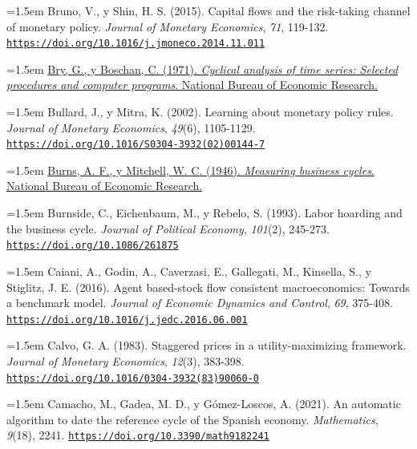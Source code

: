 \documentclass[10pt,a4paper]{article}
\begin{document}
\noindent\hangindent=1.5em Bruno, V., y Shin, H. S. (2015). Capital flows and the risk-taking channel of monetary policy. \textit{Journal of Monetary Economics}, \textit{71}, 119-132. \href{https://doi.org/10.1016/j.jmoneco.2014.11.011}{\nolinkurl{https://doi.org/10.1016/j.jmoneco.2014.11.011}}

\noindent\hangindent=1.5em \href{https://www.nber.org/books-and-chapters/cyclical-analysis-time-series-selected-procedures-and-computer-programs}{Bry, G., y Boschan, C. (1971). \textit{Cyclical analysis of time series: Selected procedures and computer programs}. National Bureau of Economic Research.}

\noindent\hangindent=1.5em Bullard, J., y Mitra, K. (2002). Learning about monetary policy rules. \textit{Journal of Monetary Economics}, \textit{49}(6), 1105-1129. \href{https://doi.org/10.1016/S0304-3932(02)00144-7}{\nolinkurl{https://doi.org/10.1016/S0304-3932(02)00144-7}}

\noindent\hangindent=1.5em \href{https://www.nber.org/books-and-chapters/measuring-business-cycles}{Burns, A. F., y Mitchell, W. C. (1946). \textit{Measuring business cycles}. National Bureau of Economic Research.}

\noindent\hangindent=1.5em Burnside, C., Eichenbaum, M., y Rebelo, S. (1993). Labor hoarding and the business cycle. \textit{Journal of Political Economy}, \textit{101}(2), 245-273. \href{https://doi.org/10.1086/261875}{\nolinkurl{https://doi.org/10.1086/261875}}

{\sloppy\noindent\hangindent=1.5em Caiani, A., Godin, A., Caverzasi, E., Gallegati, M., Kinsella, S., y Stiglitz, J. E. (2016). Agent based-stock flow consistent macroeconomics: Towards a benchmark model. \textit{Journal of Economic Dynamics and Control}, \textit{69}, 375-408. \href{https://doi.org/10.1016/j.jedc.2016.06.001}{\nolinkurl{https://doi.org/10.1016/j.jedc.2016.06.001}}\par}

\noindent\hangindent=1.5em Calvo, G. A. (1983). Staggered prices in a utility-maximizing framework. \textit{Journal of Monetary Economics}, \textit{12}(3), 383-398. \href{https://doi.org/10.1016/0304-3932(83)90060-0}{\nolinkurl{https://doi.org/10.1016/0304-3932(83)90060-0}}

\noindent\hangindent=1.5em Camacho, M., Gadea, M. D., y Gómez-Loscos, A. (2021). An automatic algorithm to date the reference cycle of the Spanish economy. \textit{Mathematics}, \textit{9}(18), 2241. \href{https://doi.org/10.3390/math9182241}{\nolinkurl{https://doi.org/10.3390/math9182241}}
\end{document}
